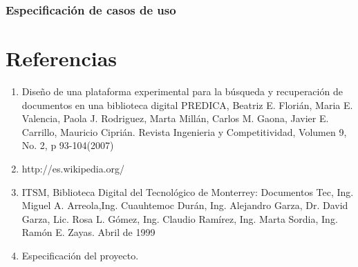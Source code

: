 \documentclass[]{article}
\begin{document}
	
	\newpage		
		\subsubsection{Especificación de casos de uso}
			
			
			
			
			
			
			
			
			
			
			
			
			
			
			
			
			
			
			
			
			
			
			
			
			
			
			

			
			
			
			
			
			
			
			
\section{Referencias}
	\begin{enumerate}
		\item Diseño de una plataforma experimental para la búsqueda y recuperación de documentos
		 en una biblioteca digital PREDICA, Beatriz E. Florián, Maria E. Valencia, Paola J. 
		 Rodriguez, Marta Millán, Carlos M. Gaona, Javier E. Carrillo, Mauricio Ciprián. Revista
		 Ingenieria y Competitividad, Volumen 9, No. 2, p 93-104(2007)
		 
		\item http://es.wikipedia.org/
		
		\item ITSM, Biblioteca Digital del Tecnológico de Monterrey: Documentos Tec, 
		Ing. Miguel A. Arreola,Ing. Cuauhtemoc Durán, Ing. Alejandro Garza, 
		Dr. David Garza, Lic. Rosa L. Gómez, Ing. Claudio Ramírez, Ing. Marta Sordia,
		Ing. Ramón E. Zayas. Abril de 1999		
		
		\item Especificación del proyecto.
	\end{enumerate}		
			
\end{document}
